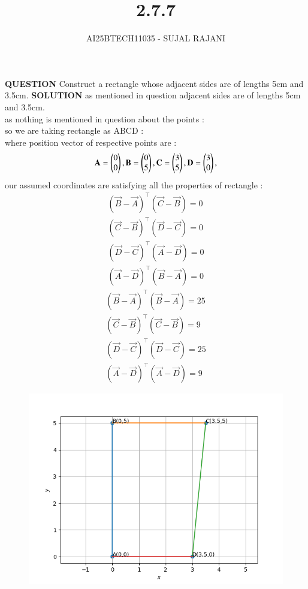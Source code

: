 \documentclass[journal,12pt,onecolumn]{IEEEtran}
\begin{document}
\title{2.7.7}
\author{AI25BTECH11035 - SUJAL RAJANI}
{\let\newpage\relax\maketitle}
\textbf{QUESTION}
Construct a rectangle whose adjacent sides are of lengths 5cm and 3.5cm.
\textbf{SOLUTION}
 as  mentioned in question adjacent sides are of lengths 5cm and 3.5cm.
 \\
as nothing is mentioned in question about the points :
\\
so we are taking rectangle as ABCD :
\\
 where position vector of respective points are :
 \\
 \begin{align*}
     \mathbf{A}=\begin{pmatrix}0\\0\end{pmatrix}, \mathbf{B}=\begin{pmatrix}0\\5\end{pmatrix}, \mathbf{C}=\begin{pmatrix}3\\5\end{pmatrix},\mathbf{D}=\begin{pmatrix}3\\0\end{pmatrix},
 \end{align*}
 our assumed coordinates are satisfying all the properties of rectangle :
 \begin{align*}
     (\vec{B}-\vec{A})^\top(\vec{C}-\vec{B})=0
     \\
      (\vec{C}-\vec{B})^\top(\vec{D}-\vec{C})=0
      \\
       (\vec{D}-\vec{C})^\top(\vec{A}-\vec{D})=0
        \\
        (\vec{A}-\vec{D})^\top(\vec{B}-\vec{A})=0
 \end{align*}
 \begin{align*}
     (\vec{B}-\vec{A})^\top(\vec{B}-\vec{A})=25
     \\
     (\vec{C}-\vec{B})^\top(\vec{C}-\vec{B})=9
     \\
      (\vec{D}-\vec{C})^\top (\vec{D}-\vec{C})=25
      \\
      (\vec{A}-\vec{D})^\top(\vec{A}-\vec{D})=9
 \end{align*}
     

        \begin{figure}[H]
    \centering
    \includegraphics[width = 0.7\columnwidth]{figs/img.png}
    \caption*{}
    \label{figs}
\end{figure}
\end{document}

